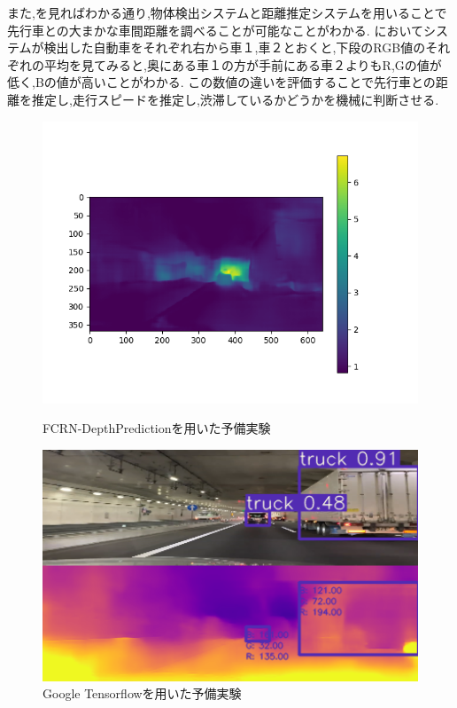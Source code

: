 また,を見ればわかる通り,物体検出システムと距離推定システムを用いることで先行車との大まかな車間距離を調べることが可能なことがわかる.
においてシステムが検出した自動車をそれぞれ右から車１,車２とおくと,下段のRGB値のそれぞれの平均を見てみると,奥にある車１の方が手前にある車２よりもR,Gの値が低く,Bの値が高いことがわかる.
この数値の違いを評価することで先行車との距離を推定し,走行スピードを推定し,渋滞しているかどうかを機械に判断させる.


\begin{figure}[htbp]
  \begin{center}
   \includegraphics[width=12cm]{figs/preex1.png}
  \end{center}
  \caption{FCRN-DepthPredictionを用いた予備実験}
  \label{fig:preex1}

 \begin{center}
  \includegraphics[width=12cm]{figs/preex2.png}
 \end{center}
  \caption{Google Tensorflowを用いた予備実験}
  \label{fig:preex2}
\end{figure}

